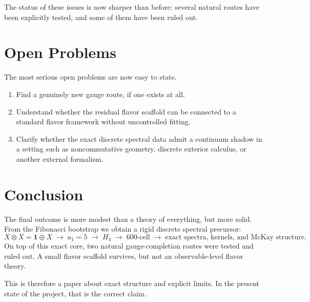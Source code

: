 \documentclass[12pt,a4paper]{article}
\theoremstyle{definition}
\begin{document}
The status of these issues is now sharper than before: several natural routes
have been explicitly tested, and some of them have been ruled out.

\section{Open Problems}

The most serious open problems are now easy to state.

\begin{enumerate}
\item Find a genuinely new gauge route, if one exists at all.
\item Understand whether the residual flavor scaffold can be connected to a
  standard flavor framework without uncontrolled fitting.
\item Clarify whether the exact discrete spectral data admit a continuum shadow
  in a setting such as noncommutative geometry, discrete exterior calculus, or
  another external formalism.
\end{enumerate}

\section{Conclusion}

The final outcome is more modest than a theory of everything, but more solid.
From the Fibonacci bootstrap we obtain a rigid discrete spectral precursor:
\[
X\otimes X=\mathbf{1}\oplus X
\;\to\;
a_1=5
\;\to\;
H_4
\;\to\;
\text{600-cell}
\;\to\;
\text{exact spectra, kernels, and McKay structure}.
\]
On top of this exact core, two natural gauge-completion routes were tested and
ruled out. A small flavor scaffold survives, but not an observable-level flavor
theory.

This is therefore a paper about exact structure and explicit limits. In the
present state of the project, that is the correct claim.
\end{document}
